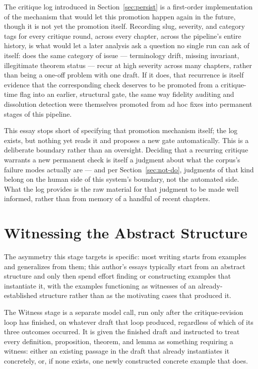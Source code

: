 \documentclass[11pt]{article}
\theoremstyle{definition}
\begin{document}
The critique log introduced in Section~\ref{sec:persist} is a
first-order implementation of the mechanism that would let this
promotion happen again in the future, though it is not yet the
promotion itself. Recording slug, severity, and category tags for every
critique round, across every chapter, across the pipeline's entire
history, is what would let a later analysis ask a question no single
run can ask of itself: does the same category of issue --- terminology
drift, missing invariant, illegitimate theorem status --- recur at high
severity across many chapters, rather than being a one-off problem with
one draft. If it does, that recurrence is itself evidence that the
corresponding check deserves to be promoted from a critique-time flag
into an earlier, structural gate, the same way fidelity auditing and
dissolution detection were themselves promoted from ad hoc fixes into
permanent stages of this pipeline.

This essay stops short of specifying that promotion mechanism itself;
the log exists, but nothing yet reads it and proposes a new gate
automatically. This is a deliberate boundary rather than an oversight.
Deciding that a recurring critique warrants a new permanent check is
itself a judgment about what the corpus's failure modes actually are
--- and per Section~\ref{sec:not-do}, judgments of that kind belong on
the human side of this system's boundary, not the automated side. What
the log provides is the raw material for that judgment to be made well
informed, rather than from memory of a handful of recent chapters.

\section{Witnessing the Abstract Structure}
\label{sec:witness}

The asymmetry this stage targets is specific: most writing starts from
examples and generalizes from them; this author's essays typically
start from an abstract structure and only then spend effort finding or
constructing examples that instantiate it, with the examples
functioning as witnesses of an already-established structure rather
than as the motivating cases that produced it.

The Witness stage is a separate model call, run only after the
critique-revision loop has finished, on whatever draft that loop
produced, regardless of which of its three outcomes occurred. It is
given the finished draft and instructed to treat every definition,
proposition, theorem, and lemma as something requiring a witness:
either an existing passage in the draft that already instantiates it
concretely, or, if none exists, one newly constructed concrete example
that does.
\end{document}
